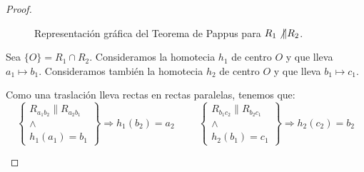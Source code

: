\begin{proof}
\begin{enumerate}
\begin{figure}[H]
            \caption{Representación gráfica del Teorema de Pappus para $R_1\not\|R_2$.}
        \end{figure}
        
        Sea $\{O\}=R_1\cap R_2$. Consideramos la homotecia $h_1$ de centro $O$ y que lleva $a_1\mapsto b_1$.
        Consideramos también la homotecia $h_2$ de centro $O$ y que lleva $b_1\mapsto c_1$.

        Como una traslación lleva rectas en rectas paralelas, tenemos que:
        \begin{equation*}
            \left\{
                \begin{array}{c}
                    R_{a_1b_2} \| R_{a_2b_1} \\
                    \land \\
                    h_1(a_1) = b_1
                \end{array}
            \right\} \Longrightarrow h_1(b_2)=a_2
            \hspace{1cm}
            \left\{
                \begin{array}{c}
                    R_{b_1c_2} \| R_{b_2c_1} \\
                    \land \\
                    h_2(b_1) = c_1
                \end{array}
            \right\} \Longrightarrow h_2(c_2)=b_2
        \end{equation*}


\end{enumerate}
\end{proof}
